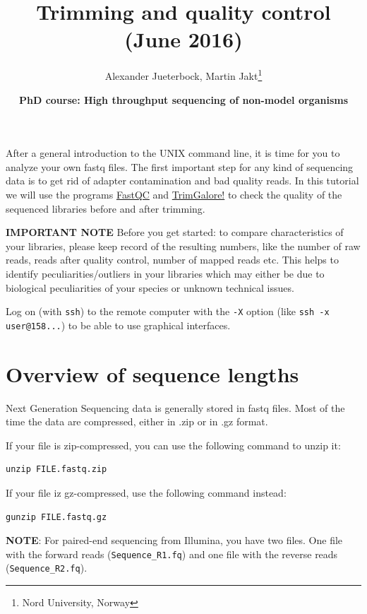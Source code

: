 \documentclass[11pt]{article}
\author{Alexander Jueterbock, Martin Jakt\thanks{Nord University, Norway}}
\date{\textbf{PhD course: High throughput sequencing of non-model organisms}}
\title{\textbf{Trimming and quality control} (June 2016)}
\begin{document}
\maketitle
\tableofcontents







After a general introduction to the UNIX command line, it is time for
you to analyze your own fastq files. The first important step for any
kind of sequencing data is to get rid of adapter contamination and 
bad quality reads. In this tutorial we will use the programs \href{http://www.bioinformatics.babraham.ac.uk/projects/fastqc/}{FastQC}
and \href{http://www.bioinformatics.babraham.ac.uk/projects/trim_galore/}{TrimGalore!} to check the quality of the sequenced libraries before
and after trimming.


\textbf{IMPORTANT NOTE} Before you get started: to compare characteristics of
your libraries, please keep record of the resulting numbers, like the
number of raw reads, reads after quality control, number of mapped
reads etc. This helps to identify peculiarities/outliers in your
libraries which may either be due to biological peculiarities of your
species or unknown technical issues.


Log on (with \texttt{ssh}) to the remote computer with the \texttt{-X} option (like
\texttt{ssh -x user@158...}) to be able to use graphical interfaces.

\section{Overview of sequence lengths}
\label{sec-1}
Next Generation Sequencing data is generally stored in fastq
files. Most of the time the data are compressed, either in .zip or in
.gz format.

If your file is zip-compressed, you can use the following command to unzip it:

\begin{verbatim}
unzip FILE.fastq.zip
\end{verbatim}

If your file iz gz-compressed, use the following command instead:

\begin{verbatim}
gunzip FILE.fastq.gz
\end{verbatim}

\textbf{NOTE}: For paired-end sequencing from Illumina, you have two
files. One file with the forward reads (\texttt{Sequence\_R1.fq}) and one file with
the reverse reads (\texttt{Sequence\_R2.fq}).
\end{document}
